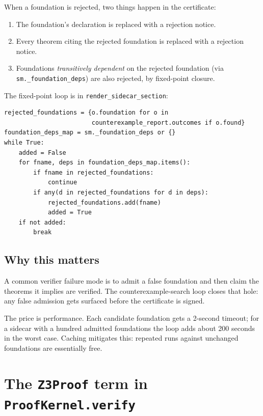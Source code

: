 When a foundation is rejected, two things happen in the certificate:
\begin{enumerate}[leftmargin=1.7em]
  \item The foundation's \Lean{} declaration is replaced with a
    rejection notice.
  \item Every theorem citing the rejected foundation is replaced
    with a rejection notice.
  \item Foundations \emph{transitively dependent} on the rejected
    foundation (via \texttt{sm.\_foundation\_deps}) are also
    rejected, by fixed-point closure.
\end{enumerate}

The fixed-point loop is in \texttt{render\_sidecar\_section}:

\begin{lstlisting}[caption={Rejection cascade in
\texttt{render\_sidecar\_section} (paraphrased).}]
rejected_foundations = {o.foundation for o in
                        counterexample_report.outcomes if o.found}
foundation_deps_map = sm._foundation_deps or {}
while True:
    added = False
    for fname, deps in foundation_deps_map.items():
        if fname in rejected_foundations:
            continue
        if any(d in rejected_foundations for d in deps):
            rejected_foundations.add(fname)
            added = True
    if not added:
        break
\end{lstlisting}

\subsection{Why this matters}

A common verifier failure mode is to admit a false foundation and
then claim the theorems it implies are verified.  The
counterexample-search loop closes that hole: any false admission
gets surfaced before the certificate is signed.

The price is performance.  Each candidate foundation gets a
2-second timeout; for a sidecar with a hundred admitted
foundations the loop adds about 200 seconds in the worst case.
Caching mitigates this: repeated runs against unchanged
foundations are essentially free.

\section{The \texttt{Z3Proof} term in \texttt{ProofKernel.verify}}
\label{sec:z3-proofterm}

